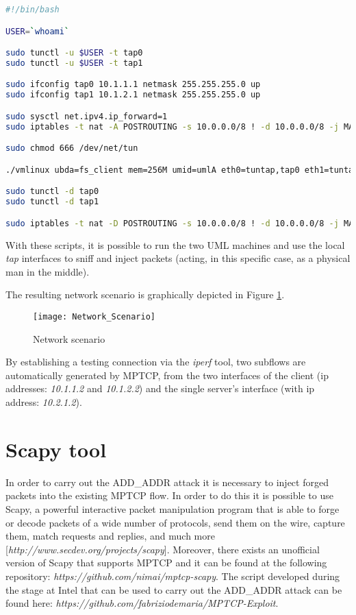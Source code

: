 \begin{lstlisting}[language=bash, caption=\textit{client.sh}]
#!/bin/bash

USER=`whoami`

sudo tunctl -u $USER -t tap0
sudo tunctl -u $USER -t tap1

sudo ifconfig tap0 10.1.1.1 netmask 255.255.255.0 up
sudo ifconfig tap1 10.1.2.1 netmask 255.255.255.0 up

sudo sysctl net.ipv4.ip_forward=1
sudo iptables -t nat -A POSTROUTING -s 10.0.0.0/8 ! -d 10.0.0.0/8 -j MASQUERADE

sudo chmod 666 /dev/net/tun

./vmlinux ubda=fs_client mem=256M umid=umlA eth0=tuntap,tap0 eth1=tuntap,tap1

sudo tunctl -d tap0
sudo tunctl -d tap1

sudo iptables -t nat -D POSTROUTING -s 10.0.0.0/8 ! -d 10.0.0.0/8 -j MASQUERADE
\end{lstlisting}

With these scripts, it is possible to run the two UML machines and use the local \textit{tap} interfaces to sniff and inject packets (acting, in this specific case, as a physical man in the middle).

The resulting network scenario is graphically depicted in Figure \ref{fig:networkscenario}.

\begin{figure}[!htb]
\centering
\texttt{[image: Network\_Scenario]}
\caption{Network scenario}
\label{fig:networkscenario}
\end{figure}

By establishing a testing connection via the \textit{iperf} tool, two subflows are automatically generated by MPTCP, from the two interfaces of the client (ip addresses: \textit{10.1.1.2} and \textit{10.1.2.2}) and the single server's interface (with ip address: \textit{10.2.1.2}).

\section{Scapy tool}
In order to carry out the ADD\_ADDR attack it is necessary to inject forged packets into the existing MPTCP flow. In order to do this it is possible to use Scapy, a powerful interactive packet manipulation program that is able to forge or decode packets of a wide number of protocols, send them on the wire, capture them, match requests and replies, and much more [\textit{http://www.secdev.org/projects/scapy}]. Moreover, there exists an unofficial version of Scapy that supports MPTCP and it can be found at the following repository: \textit{https://github.com/nimai/mptcp-scapy}. The script developed during the stage at Intel that can be used to carry out the ADD\_ADDR attack can be found here: \textit{https://github.com/fabriziodemaria/MPTCP-Exploit}. 

